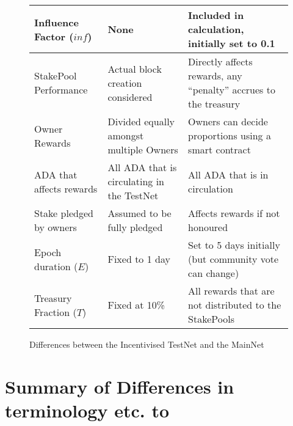 \documentclass[11pt,a4paper,dvipsnames,twosided,final]{article}
\begin{document}
\begin{figure}[h!]
\begin{center}
\begin{tabular}{||l|p{4cm}|p{4cm}||}
Influence Factor ($\textit{inf}$)
& None
& Included in calculation, initially set to 0.1
                                              \\\hline
StakePool Performance
& Actual block creation considered
& Directly affects rewards, any ``penalty'' accrues to the treasury
                                              \\\hline
Owner Rewards
& Divided equally amongst multiple Owners
& Owners can decide proportions using a smart contract
                                              \\\hline
ADA that affects rewards
& All ADA that is circulating in the TestNet
& All ADA that is in circulation
                                              \\\hline
Stake pledged by owners
& Assumed to be fully pledged
& %
Affects rewards if not honoured
                                              \\\hline
Epoch duration ($E$)
& Fixed to 1 day
& Set to 5 days initially (but community vote can change)
                                              \\\hline
Treasury Fraction ($T$)
& Fixed at 10\%
& All rewards that are not distributed to the StakePools
                                              \\\hline
\hline
\end{tabular}
\end{center}
\caption{Differences between the Incentivised TestNet and the MainNet}
\end{figure}

\clearpage



\clearpage
\appendix

\section{Summary of Differences in terminology etc. to \cite{delegation_design}}
\label{app:diffs}
\end{document}
